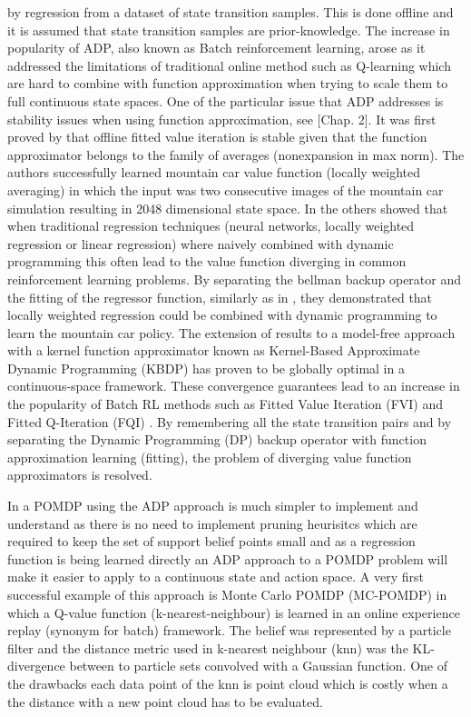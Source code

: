 \documentclass[final,5p,times,twocolumn]{elsarticle}
\begin{document}
by regression from a dataset of state transition samples. This is done offline and it is assumed that state transition samples are prior-knowledge. 
The increase in popularity of ADP, also known as Batch reinforcement learning, arose as it addressed the limitations of traditional online 
method such as Q-learning which are hard to combine with function approximation when trying to scale them to full continuous state spaces. One 
of the particular issue that ADP addresses is stability issues when using function approximation, see \cite{RL_state_art_2012}[Chap. 2]. It was 
first proved by \cite{stable_FA_gordon_1995} that offline fitted value iteration is stable given that the function approximator belongs to 
the family of averages (nonexpansion in max norm). The authors successfully learned mountain car value function (locally weighted averaging) 
in which the input was two consecutive images of the mountain car simulation resulting in 2048 dimensional state space. In \cite{Boyan95generalizationin}
the others showed that when traditional regression techniques (neural networks, locally weighted regression or linear regression) where naively combined
with dynamic programming this often lead to the value function diverging in common reinforcement learning problems. By separating the 
bellman backup operator and the fitting of the regressor function, similarly as in \cite{stable_FA_gordon_1995}, they demonstrated that locally weighted 
regression could be combined with dynamic programming to learn the mountain car policy. The extension of \cite{stable_FA_gordon_1995} results 
to a model-free approach with a kernel function approximator known as Kernel-Based Approximate Dynamic Programming (KBDP) \cite{kernel_rl_ormoneit_2002} 
has proven to be globally optimal in a continuous-space framework.  These convergence guarantees lead to an increase in the popularity of 
Batch RL methods such as Fitted Value Iteration (FVI) \cite{fvi_uav_2010} and Fitted Q-Iteration (FQI) \cite{EGW05,fqi_nips_peter_2009}. 
By remembering all the state transition pairs and by separating the Dynamic Programming (DP) backup operator with function approximation learning (fitting), 
the problem of diverging value function approximators is resolved. 


In a POMDP using the ADP approach is much simpler to implement and understand as there is no need to implement pruning heurisitcs which 
are required to keep the set of support belief points small and as a regression function is being learned directly an ADP approach to a POMDP 
problem will make it easier to apply to a continuous state and action space.  A very first successful example of this approach is Monte Carlo POMDP 
(MC-POMDP) \cite{Thrun_1999} in which a Q-value function (k-nearest-neighbour) is learned in an online experience replay (synonym for batch)  
framework. The belief was represented by a particle filter and the distance metric used in k-nearest neighbour (knn) was the KL-divergence between 
to particle sets convolved with a Gaussian function. One of the drawbacks each data point of the knn is point cloud which is costly when a the distance 
with a new point cloud has to be evaluated. 
\end{document}
